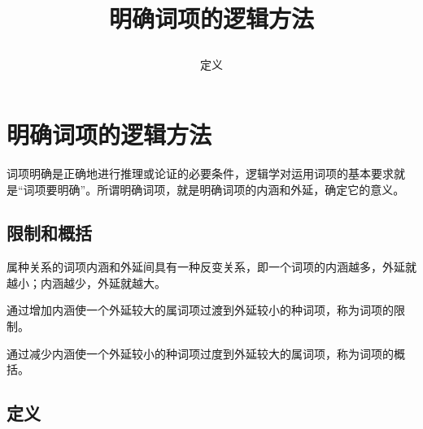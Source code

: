 \documentclass[
    a4paper,
    twoside
    ]{article}
\title{\zihao{2}\heiti 明确词项的逻辑方法 \\ \subtitle{定义}}
\date{}
\newcommand\myemptypage{
    \null
    \thispagestyle{empty}
    \addtocounter{page}{-1}
    \newpage
}
\begin{document}
    \maketitle
    \thispagestyle{empty}

    \newpage

    \myemptypage

    \setcounter{page}{1}
    \cfoot{\thepage}
    \renewcommand{\footrulewidth}{1pt}
    \tableofcontents
    \newpage

    \setcounter{page}{1}


    \section{ 明确词项的逻辑方法 }
        {
            词项明确是正确地进行推理或论证的必要条件，逻辑学对运用词项的基本要求就是``词项要明确''。所谓明确词项，就是明确词项的内涵和外延，确定它的意义。
        }
        \subsection{限制和概括}
            
                属种关系的词项内涵和外延间具有一种反变关系，即一个词项的内涵越多，外延就越小；内涵越少，外延就越大。

                通过增加内涵使一个外延较大的属词项过渡到外延较小的种词项，称为词项的限制。

                通过减少内涵使一个外延较小的种词项过度到外延较大的属词项，称为词项的概括。

        \subsection{定义}
\end{document}
